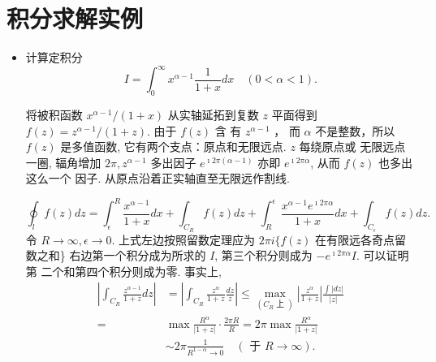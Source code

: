 \section{积分求解实例}

\begin{itemize}
    \item 计算定积分 
    $$
    I=\int_0^{\infty} x^{\alpha-1} \frac{1}{1+x} d x \quad(0<\alpha<1).
    $$

    将被积函数 $x^{\alpha-1} /(1+x)$ 从实轴延拓到复数 $z$ 平面得到 
    $f(z)=z^{\alpha-1} /(1+z)$. 由于 $f(z)$ 含 有 $z^{\alpha-1}$ ，
    而 $\alpha$ 不是整数，所以 $f(z)$ 是多值函数, 它有两个支点：原点和无限远点. 
    $z$ 每绕原点或 无限远点一圈, 辐角增加 $2 \pi, z^{\alpha-1}$ 多出因子 
    $e^{\imath 2 \pi(\alpha-1)}$ 亦即 $e^{\imath 2 \pi \alpha}$,
     从而 $f(z)$ 也多出这么一个 因子.
    从原点沿着正实轴直至无限远作割线.   
    
    $$
\oint_l f(z) d z=\int_{\epsilon}^R \frac{x^{\alpha-1}}{1+x} d x+\int_{C_R} f(z) d z+\int_R^{\epsilon} \frac{x^{\alpha-1} e^{\imath 2 \pi \alpha}}{1+x} d x+\int_{C_{\epsilon}} f(z) d z .
$$
令 $R \rightarrow \infty, \epsilon \rightarrow 0$.
 上式左边按照留数定理应为 $2 \pi i\{f(z)$ 在有限远各奇点留数之和\}
  右边第一个积分成为所求的 $I$, 第三个积分则成为 $-e^{\imath 2 \pi \alpha} I$. 
  可以证明第 二个和第四个积分则成为零. 事实上,
  $$
\begin{aligned}
\left|\int_{C_R} \frac{z^{\alpha-1}}{1+z} d z\right| & =\left|\int_{C_R} \frac{z^\alpha}{1+z} \frac{d z}{z}\right| \leqslant \max _{\left(C_R \text { 上 }\right)}\left|\frac{z^\alpha}{1+z}\right| \frac{\int|d z|}{|z|} \\
= & \max \frac{R^\alpha}{|1+z|} \cdot \frac{2 \pi R}{R}=2 \pi \max \frac{R^\alpha}{|1+z|} \\
& \sim 2 \pi \frac{1}{R^{1-\alpha} \rightarrow 0} \quad(\text { 于 } R \rightarrow \infty) .
\end{aligned}
$$


\end{itemize}
